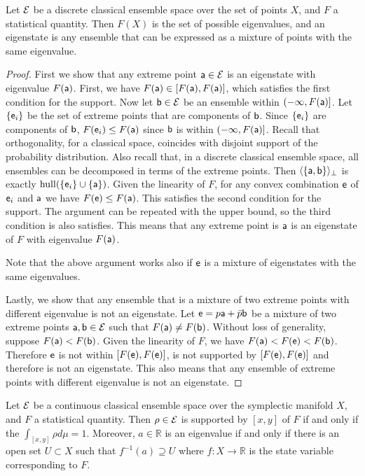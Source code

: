 \begin{prop}
	Let $\Ens$ be a discrete classical ensemble space over the set of points $X$, and $F$ a statistical quantity. Then $F(X)$ is the set of possible eigenvalues, and an eigenstate is any ensemble that can be expressed as a mixture of points with the same eigenvalue.
\end{prop}

\begin{proof}
	First we show that any extreme point $\ens[a] \in \Ens$ is an eigenstate with eigenvalue $F(\ens[a])$. First, we have $F(\ens[a]) \in [F(\ens[a]), F(\ens[a])]$, which satisfies the first condition for the support. Now let $\ens[b] \in \Ens$ be an ensemble within $(-\infty, F(\ens[a])]$. Let $\{\ens_i\}$ be the set of extreme points that are components of $\ens[b]$. Since $\{\ens_i\}$ are components of $\ens[b]$, $F(\ens_i) \leq F(\ens[a])$ since $\ens[b]$ is within $(-\infty, F(\ens[a])]$. Recall that orthogonality, for a classical space, coincides with disjoint support of the probability distribution. Also recall that, in a discrete classical ensemble space, all ensembles can be decomposed in terms of the extreme points. Then $\langle \{\ens[a], \ens[b]\} \rangle_{\ortho}$ is exactly $\hull(\{\ens_i\} \cup \{\ens[a]\})$. Given the linearity of $F$, for any convex combination $\ens$ of $\ens_i$ and $\ens[a]$ we have $F(\ens) \leq F(\ens[a])$. This satisfies the second condition for the support. The argument can be repeated with the upper bound, so the third condition is also satisfies. This means that any extreme point is $\ens[a]$ is an eigenstate of $F$ with eigenvalue $F(\ens[a])$.
	
	Note that the above argument works also if $\ens$ is a mixture of eigenstates with the same eigenvalues. 
	
	Lastly, we show that any ensemble that is a mixture of two extreme points with different eigenvalue is not an eigenstate.
	Let $\ens = p \ens[a] + \bar{p} \ens[b]$ be a mixture of two extreme points $\ens[a], \ens[b] \in \Ens$ such that $F(\ens[a]) \neq F(\ens[b])$. Without loss of generality, suppose $F(\ens[a]) < F(\ens[b])$. Given the linearity of $F$, we have $F(\ens[a]) < F(\ens) < F(\ens[b])$. Therefore $\ens$ is not within $[F(\ens),F(\ens)]$, is not supported by $[F(\ens),F(\ens)]$ and therefore is not an eigenstate. This also means that any ensemble of extreme points with different eigenvalue is not an eigenstate.
\end{proof}

\begin{prop}
	Let $\Ens$ be a continuous classical ensemble space over the symplectic manifold $X$, and $F$ a statistical quantity. Then $\rho \in \Ens$ is supported by $[x,y]$ of $F$ if and only if the $\int_{[x,y]} \rho d\mu = 1$. Moreover, $a \in \mathbb{R}$ is an eigenvalue if and only if there is an open set $U \subset X$ such that $f^{-1}(a) \supseteq U$ where $f : X \to \mathbb{R}$ is the state variable corresponding to $F$.
\end{prop}

